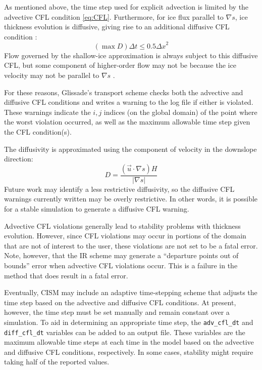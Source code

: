 As mentioned above, the time step used for explicit advection is limited by the
advective CFL condition \eqref{eq:CFL}.  
Furthermore, for ice flux parallel to $\nabla s$, ice thickness evolution is diffusive,
giving rise to an additional diffusive CFL condition \citep{Bueler:2009ee}:
\begin{equation}
  (\max D) \Delta t \leq 0.5 {\Delta x}^2 
\end{equation}
Flow governed by the shallow-ice approximation is always subject to this diffusive CFL,
but some component of higher-order flow may not be because the ice
velocity may not be parallel to $\nabla s$ \citep{Bueler:2009ee}.

For these reasons, Glissade's transport scheme checks both the
advective and diffusive CFL conditions and writes a warning to the log file if
either is violated.  These warnings indicate the $i,j$ indices (on the global domain)
of the point where the worst violation occurred, as well as the maximum allowable time step
given the CFL condition(s).

The diffusivity is approximated using the component of velocity in the downslope
direction:
\begin{equation}
  D = \frac{(\vec{u} \cdot \nabla s) H}{|\nabla s|}
\end{equation}
Future work may identify a less restrictive diffusivity, so the diffusive CFL 
warnings currently written may be overly restrictive.  In other words, it is possible
for a stable simulation to generate a diffusive CFL warning.  

Advective CFL violations generally lead to stability problems with 
thickness evolution.  However, since CFL violations may occur in portions of the
domain that are not of interest to the user, these violations are not set to be
a fatal error.  Note, however, that the IR scheme may generate
a ``departure points out of bounds'' error when advective CFL violations occur.
This is a failure in the method that does result in a fatal error.

Eventually, CISM may include an adaptive time-stepping scheme that adjusts the 
time step based on the advective and diffusive CFL conditions.
At present, however, the time step must be set manually and remain constant over a simulation.
To aid in determining an appropriate time step, the \texttt{adv\_cfl\_dt}
and \texttt{diff\_cfl\_dt} variables can be added to an output file.  These variables
are the maximum allowable time steps at each time in the model based on the 
advective and diffusive CFL conditions, respectively.  In some cases,
stability might require taking half of the reported values.



